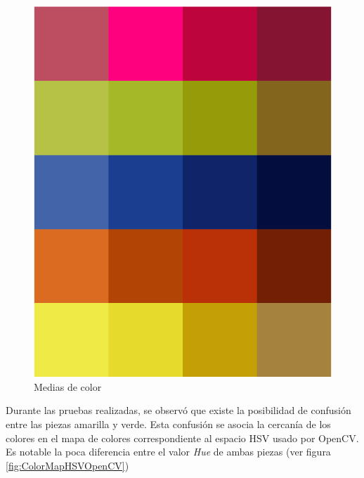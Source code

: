 \begin{figure}[ht]
    \centering
    \includegraphics[scale=0.3]{Figures/AllMeans.png}
        \caption{Medias de color}
        \label{fig:AllMeans}
\end{figure}

Durante las pruebas realizadas, se observó que existe la posibilidad de confusión entre las piezas amarilla y verde. Esta confusión se asocia la cercanía de los colores en el mapa de colores correspondiente al espacio HSV usado por OpenCV. Es notable la poca diferencia entre el valor \textit{Hue} de ambas piezas (ver figura \ref{fig:ColorMapHSVOpenCV}) 

